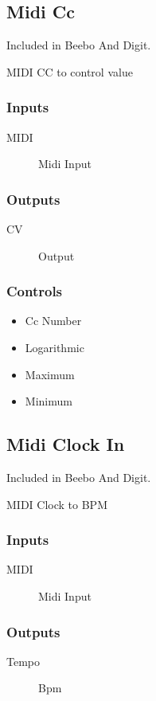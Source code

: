 \subsection{Midi Cc}

Included in Beebo And Digit.

MIDI CC to control value



\subsubsection{Inputs}
\begin{description}
\item [MIDI] Midi Input
\end{description}

\subsubsection{Outputs}
\begin{description}
\item [CV] Output
\end{description}

\subsubsection{Controls}
\begin{itemize}
\item Cc Number
\item Logarithmic
\item Maximum
\item Minimum
\end{itemize}

\subsection{Midi Clock In}

Included in Beebo And Digit.

MIDI Clock to BPM



\subsubsection{Inputs}
\begin{description}
\item [MIDI] Midi Input
\end{description}

\subsubsection{Outputs}
\begin{description}
\item [Tempo] Bpm
\end{description}

